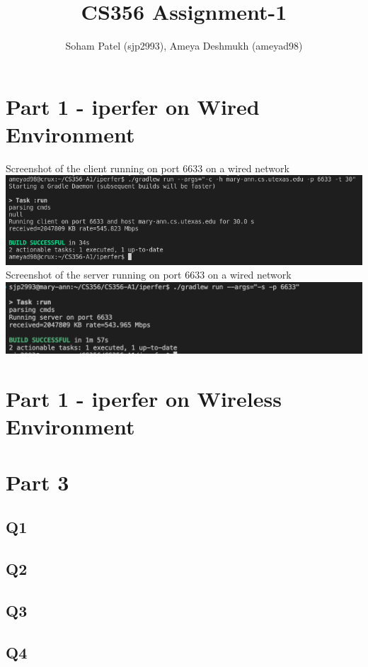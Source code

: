 \documentclass{article}
\title{CS356 Assignment-1}
\begin{document}
    \author{Soham Patel (sjp2993), Ameya Deshmukh (ameyad98)}
    \maketitle{}
    \section{Part 1 - iperfer on Wired Environment}
    Screenshot of the client running on port 6633 on a wired network
    \includegraphics[width=.7\linewidth]{client_6633_wired}
    Screenshot of the server running on port 6633 on a wired network
    \includegraphics[width=.7\linewidth]{server_6633_wired}
    \section{Part 1 - iperfer on Wireless Environment}
    \section{Part 3}
    \subsection{Q1}
    
    \subsection{Q2}
    \subsection{Q3}
    \subsection{Q4}
\end{document}
